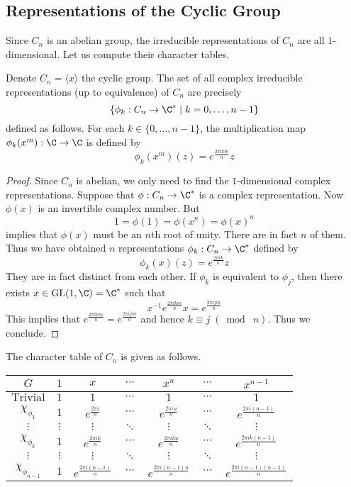 \documentclass[a4paper]{article}
\begin{document}
\subsection{Representations of the Cyclic Group}
Since $C_n$ is an abelian group, the irreducible representations of $C_n$ are all $1$-dimensional. Let us compute their character tables. 

\begin{thm}{}{} Denote $C_n=\langle x\rangle$ the cyclic group. The set of all complex irreducible representations (up to equivalence) of $C_n$ are precisely $$\{\phi_k:C_n\to\C^\ast\;|\;k=0,\dots,n-1\}$$ defined as follows. For each $k\in\{0,\dots,n-1\}$, the multiplication map $\phi_k(x^m):\C\to\C$ is defined by $$\phi_k(x^m)(z)=e^{\frac{2\pi ikm}{n}}z$$ \tcbline
\begin{proof}
Since $C_n$ is abelian, we only need to find the $1$-dimensional complex representations. Suppose that $\phi:C_n\to\C^\ast$ is a complex representation. Now $\phi(x)$ is an invertible complex number. But $$1=\phi(1)=\phi(x^n)=\phi(x)^n$$ implies that $\phi(x)$ must be an $n$th root of unity. There are in fact $n$ of them. Thus we have obtained $n$ representations $\phi_k:C_n\to\C^\ast$ defined by $$\phi_k(x)(z)=e^{\frac{2\pi ik}{n}}z$$ They are in fact distinct from each other. If $\phi_k$ is equivalent to $\phi_j$, then there exists $x\in\text{GL}(1,\C)=\C^\ast$ such that $$x^{-1}e^{\frac{2\pi ikm}{n}}x=e^{\frac{2\pi ijm}{n}}$$ This implies that $e^{\frac{2\pi ikm}{n}}=e^{\frac{2\pi ijm}{n}}$ and hence $k\equiv j\;(\bmod\;n)$. Thus we conclude. 
\end{proof}
\end{thm}

\begin{thm}{}{} The character table of $C_n$ is given as follows. 
\begin{center}
\begin{tabular}{ c|cccccc } 
$G$ & $1$ & $x$ & $\cdots$ & $x^u$ & $\cdots$ & $x^{n-1}$ \\\hline
$\text{Trivial}$ & $1$ & $1$ & $\cdots$ & $1$ & $\cdots$ & $1$ \\
$\chi_{\phi_1}$ & $1$ & $e^{\frac{2\pi i}{n}}$ & $\cdots$ & $e^{\frac{2\pi iu}{n}}$ & $\cdots$ & $e^{\frac{2\pi i(n-1)}{n}}$ \\
$\vdots$ & $\vdots$ & $\vdots$ & $\ddots$ & $\vdots$ & $\ddots$ & $\vdots$ \\
$\chi_{\phi_k}$ & $1$ & $e^{\frac{2\pi ik}{n}}$ & $\cdots$ & $e^{\frac{2\pi iku}{n}}$ & $\cdots$ & $e^{\frac{2\pi ik(n-1)}{n}}$ \\
$\vdots$ & $\vdots$ & $\vdots$ & $\ddots$ & $\vdots$ & $\ddots$ & $\vdots$ \\
$\chi_{\phi_{n-1}}$ & $1$ & $e^{\frac{2\pi i(n-1)}{n}}$ & $\cdots$ & $e^{\frac{2\pi i(n-1)u}{n}}$ & $\cdots$ & $e^{\frac{2\pi i(n-1)(n-1)}{n}}$ \\
\end{tabular}
\end{center}
\end{thm}
\end{document}
